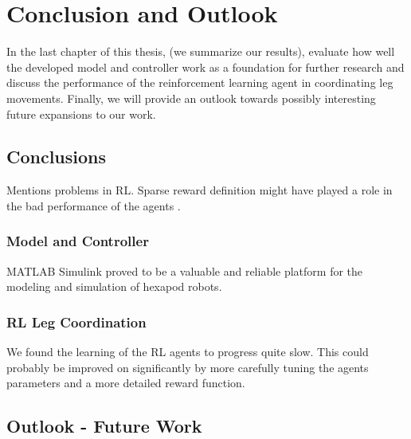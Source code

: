 \chapter{Conclusion and Outlook}
\label{ch:conclusion}

In the last chapter of this thesis, (we summarize our results), evaluate how well the developed model and controller work as a foundation for further research and discuss the performance of the reinforcement learning agent in coordinating leg movements.
Finally, we will provide an outlook towards possibly interesting future expansions to our work.


\section{Conclusions}
Mentions problems in RL.
Sparse reward definition might have played a role in the bad performance of the agents \parencite{matheron2019problem}.




\subsection{Model and Controller}
MATLAB Simulink proved to be a valuable and reliable platform for the modeling and simulation of hexapod robots.

\subsection{RL Leg Coordination}
We found the learning of the RL agents to progress quite slow. 
This could probably be improved on significantly by more carefully tuning the agents parameters and a more detailed reward function.



\section{Outlook - Future Work}



